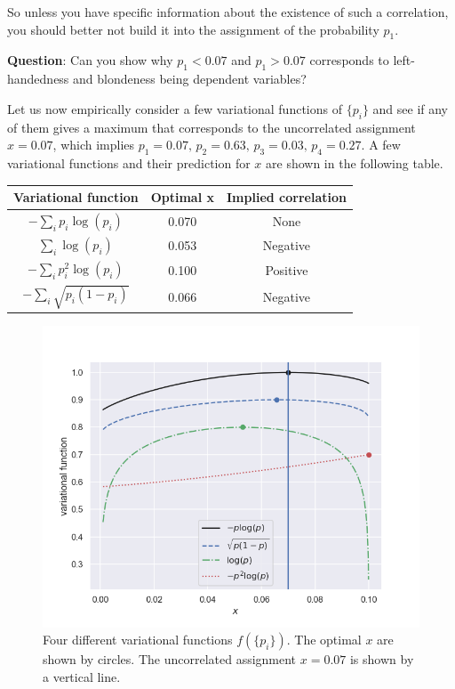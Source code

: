 \documentclass[%
oneside,                 %
final,                   %
10pt]{article}
\begin{document}
So unless you have specific information about the existence of such a correlation, you should better not build it into the assignment of the probability $p_1$.

\textbf{Question}: Can you show why $p_1 < 0.07$ and $p_1 > 0.07$ corresponds to left-handedness and blondeness being dependent variables?

Let us now empirically consider a few variational functions of $\{ p_i \}$ and see if any of them gives a maximum that corresponds to the uncorrelated assignment $x=0.07$, which implies $p_1 = 0.07, \, p_2 = 0.63, \, p_3 = 0.03, \, p_4 = 0.27$. A few variational functions and their prediction for $x$ are shown in the following table.



\begin{tabular}{ccc}
\hline
\multicolumn{1}{c}{ Variational function } & \multicolumn{1}{c}{ Optimal x } & \multicolumn{1}{c}{ Implied correlation } \\
\hline
$-\sum_i p_i \log(p_i)$     & 0.070     & None                \\
$\sum_i \log(p_i)$          & 0.053     & Negative            \\
$-\sum_i p_i^2 \log(p_i)$   & 0.100     & Positive            \\
$-\sum_i \sqrt{p_i(1-p_i)}$ & 0.066     & Negative            \\
\hline
\end{tabular}


\noindent

\begin{figure}[!ht]  %
  \centerline{\includegraphics[width=0.8\linewidth]{fig/scandinavian_entropy.png}}
  \caption{
  Four different variational functions $f\left( \{ p_i \} \right)$. The optimal $x$ are shown by circles. The uncorrelated assignment $x=0.07$ is shown by a vertical line.
  }
\end{figure}
\end{document}
